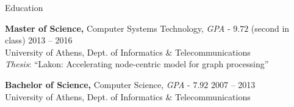\documentclass{resume}
\begin{document}

\begin{rSection}{Education}

{\bf Master of Science,} 
{Computer Systems Technology}, \textit{GPA} - $9.72$ {(second in class)} \hfill {2013 -- 2016 } \\
University of Athens, Dept. of Informatics \& Telecommunications \\
\textit{Thesis}: ``Lakon: Accelerating node-centric model for graph processing'' 


{\bf Bachelor of Science,} Computer Science, \textit{GPA} - $7.92$ \hfill {2007 -- 2013}  \\
University of Athens, Dept. of Informatics \& Telecommunications \\

\end{rSection}


%



\end{document}
